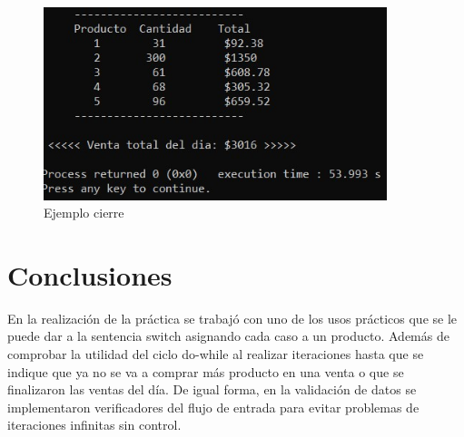\documentclass[12pt, letterpaper]{article}
\begin{document}
    \begin{figure}[p]
    \centering
    \includegraphics[width=10cm]{cierre.jpg}
    \caption {Ejemplo cierre \label{fig:Fig16}}
    \end{figure}
         
    \newpage

    \section{Conclusiones}
    En la realización de la práctica se trabajó con uno de los usos prácticos que se le puede dar a la sentencia switch asignando cada caso a un producto. Además de comprobar la utilidad del ciclo do-while al realizar iteraciones hasta que se indique que ya no se va a comprar más producto en una venta o que se finalizaron las ventas del día. De igual forma, en la validación de datos se implementaron verificadores del flujo de entrada para evitar problemas de iteraciones infinitas sin control.
    
\end{document}
